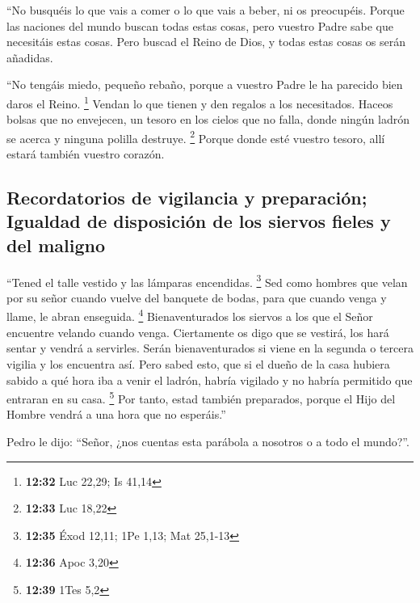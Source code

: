  ``No busquéis lo que vais a comer o lo que vais a beber,
ni os preocupéis.  Porque las naciones del mundo buscan
todas estas cosas, pero vuestro Padre sabe que necesitáis estas cosas.
 Pero buscad el Reino de Dios, y todas estas cosas os
serán añadidas.

 ``No tengáis miedo, pequeño rebaño, porque a vuestro
Padre le ha parecido bien daros el Reino. \footnote{\textbf{12:32} Luc
  22,29; Is 41,14}  Vendan lo que tienen y den regalos a
los necesitados. Haceos bolsas que no envejecen, un tesoro en los cielos
que no falla, donde ningún ladrón se acerca y ninguna polilla destruye.
\footnote{\textbf{12:33} Luc 18,22}  Porque donde esté
vuestro tesoro, allí estará también vuestro corazón.

\hypertarget{recordatorios-de-vigilancia-y-preparaciuxf3n-igualdad-de-disposiciuxf3n-de-los-siervos-fieles-y-del-maligno}{%
\subsection{Recordatorios de vigilancia y preparación; Igualdad de
disposición de los siervos fieles y del
maligno}\label{recordatorios-de-vigilancia-y-preparaciuxf3n-igualdad-de-disposiciuxf3n-de-los-siervos-fieles-y-del-maligno}}

 ``Tened el talle vestido y las lámparas encendidas.
\footnote{\textbf{12:35} Éxod 12,11; 1Pe 1,13; Mat 25,1-13}
 Sed como hombres que velan por su señor cuando vuelve
del banquete de bodas, para que cuando venga y llame, le abran
enseguida. \footnote{\textbf{12:36} Apoc 3,20} 
Bienaventurados los siervos a los que el Señor encuentre velando cuando
venga. Ciertamente os digo que se vestirá, los hará sentar y vendrá a
servirles.  Serán bienaventurados si viene en la segunda
o tercera vigilia y los encuentra así.  Pero sabed esto,
que si el dueño de la casa hubiera sabido a qué hora iba a venir el
ladrón, habría vigilado y no habría permitido que entraran en su casa.
\footnote{\textbf{12:39} 1Tes 5,2}  Por tanto, estad
también preparados, porque el Hijo del Hombre vendrá a una hora que no
esperáis.''

 Pedro le dijo: ``Señor, ¿nos cuentas esta parábola a
nosotros o a todo el mundo?''.

